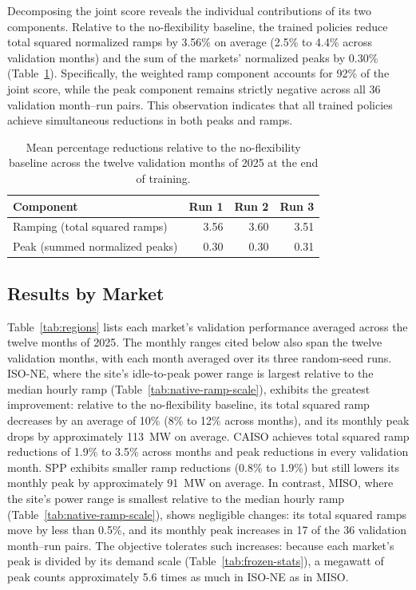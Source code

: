 \documentclass{UNCC-thesis}
\begin{document}
Decomposing the joint score reveals the individual contributions of its two components. Relative
to the no-flexibility baseline, the trained policies reduce total squared normalized ramps by
3.56\% on average (2.5\% to 4.4\% across validation months) and the sum of the markets' normalized
peaks by 0.30\% (Table~\ref{tab:nf-percentages}). Specifically, the weighted ramp component
accounts for 92\% of the joint score, while the peak component remains strictly negative across
all 36 validation month--run pairs. This observation indicates that all trained policies achieve
simultaneous reductions in both peaks and ramps.

\begin{table}[htbp]
  \centering
  \footnotesize
  \caption[Mean percentage reductions relative to the no-flexibility baseline]{Mean percentage
  reductions relative to the no-flexibility baseline across the twelve validation months of 2025
  at the end of training.}
  \label{tab:nf-percentages}
  \begin{tabular}{@{}lrrr@{}}
    \toprule
    Component & Run 1 & Run 2 & Run 3 \\
    \midrule
    Ramping (total squared ramps) & 3.56 & 3.60 & 3.51 \\
    Peak (summed normalized peaks) & 0.30 & 0.30 & 0.31 \\
    \bottomrule
  \end{tabular}
\end{table}

\subsection{Results by Market}
\label{subsec:results-cv-markets}

Table~\ref{tab:regions} lists each market's validation performance averaged across the twelve
months of 2025. The monthly ranges cited below also span the twelve validation months, with each
month averaged over its three random-seed runs. ISO-NE, where the site's idle-to-peak power range
is largest relative to the median hourly ramp (Table~\ref{tab:native-ramp-scale}), exhibits the
greatest improvement: relative to the no-flexibility baseline, its total squared ramp decreases by
an average of 10\% (8\% to 12\% across months), and its monthly peak drops by approximately 113~MW
on average. CAISO achieves total squared ramp reductions of 1.9\% to 3.5\% across months and peak
reductions in every validation month. SPP exhibits smaller ramp reductions (0.8\% to 1.9\%)
but still lowers its monthly peak by approximately 91~MW on average. In contrast, MISO, where the
site's power range is smallest relative to the median hourly ramp
(Table~\ref{tab:native-ramp-scale}), shows negligible changes: its total squared ramps move by
less than 0.5\%, and its monthly peak increases in 17 of the 36 validation month--run pairs. The
objective tolerates such increases: because each market's peak is divided by its demand scale
(Table~\ref{tab:frozen-stats}), a megawatt of peak counts approximately 5.6 times as much in ISO-NE
as in MISO.
\end{document}
